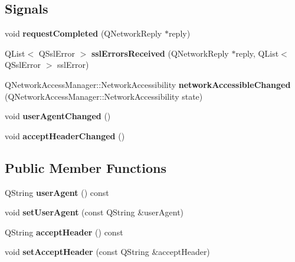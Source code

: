\subsection*{Signals}
\begin{DoxyCompactItemize}
\item 
\mbox{\label{classNetwork_1_1Manager_a1863c9a52ea6587387c8a688b92a2204}} 
void {\bfseries request\+Completed} (Q\+Network\+Reply $\ast$reply)
\item 
\mbox{\label{classNetwork_1_1Manager_a4fd0af58f8fcd61b2c17d2dd368693c6}} 
Q\+List$<$ Q\+Ssl\+Error $>$ {\bfseries ssl\+Errors\+Received} (Q\+Network\+Reply $\ast$reply, Q\+List$<$ Q\+Ssl\+Error $>$ ssl\+Error)
\item 
\mbox{\label{classNetwork_1_1Manager_a39de38077117c92e1e9d6aea325b9537}} 
Q\+Network\+Access\+Manager\+::\+Network\+Accessibility {\bfseries network\+Accessible\+Changed} (Q\+Network\+Access\+Manager\+::\+Network\+Accessibility state)
\item 
\mbox{\label{classNetwork_1_1Manager_ad8dd2cecf77ca5869e46b4268e6e0c9a}} 
void {\bfseries user\+Agent\+Changed} ()
\item 
\mbox{\label{classNetwork_1_1Manager_a1f37b9f5fe58a613d5095893e7c9ddb7}} 
void {\bfseries accept\+Header\+Changed} ()
\end{DoxyCompactItemize}
\subsection*{Public Member Functions}
\begin{DoxyCompactItemize}
\item 
\mbox{\label{classNetwork_1_1Manager_aa4f7e5630c9c95932146f0f97eb38ca1}} 
Q\+String {\bfseries user\+Agent} () const
\item 
\mbox{\label{classNetwork_1_1Manager_acb21aaf997144be186e7e07043cd04ba}} 
void {\bfseries set\+User\+Agent} (const Q\+String \&user\+Agent)
\item 
\mbox{\label{classNetwork_1_1Manager_ac0db9092d325d920fff7a2d095cf506b}} 
Q\+String {\bfseries accept\+Header} () const
\item 
\mbox{\label{classNetwork_1_1Manager_ab2c4f941034a92beae89f5657777f992}} 
void {\bfseries set\+Accept\+Header} (const Q\+String \&accept\+Header)
\end{DoxyCompactItemize}
